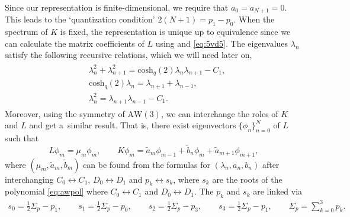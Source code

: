 \documentclass[pdftex]{sigma}
\numberwithin{equation}{section}
\newcommand{\aw}{\mathrm{AW}\!\left(3\right)}
\newcommand{\chq}{\mathrm{cosh}_q}
\newcommand{\half}{\frac{1}{2}}
\begin{document}
Since our representation is finite-dimensional, we require that $a_0=a_{N+1}=0$. This leads to the `quantization condition' $2(N+1)=p_1-p_0$. When the spectrum of $K$ is fixed, the representation is unique up to equivalence since we can calculate the matrix coefficients of $L$ using \cite[equation~(1.12)]{Zhedanov1991} and \eqref{eq:5vd5}. The eigenvalues $\lambda_n$ satisfy the following recursive relations, which we will need later on,
\begin{gather}
\begin{split}
&\lambda_n^2+\lambda_{n+1}^2 = \chq(2)\lambda_n\lambda_{n+1}-C_1, \\
&\chq(2)\lambda_n=\lambda_{n+1}+\lambda_{n-1},\\
&\lambda_n^2=\lambda_{n+1}\lambda_{n-1} -C_1.
\end{split}\label{eq:spectrumrecursiverelations}
\end{gather}
Moreover, using the symmetry of $\aw$, we can interchange the roles of $K$ and $L$ and get a~similar result. That is, there exist eigenvectors $\{\phi_n\}_{n=0}^N$ of $L$ such that
\begin{equation}\label{eq:1vd5omgedraaid}
		L\phi_m=\mu_m \phi_m,\qquad
		K\phi_m=\tilde{a}_m\phi_{m-1}+\tilde{b}_n\phi_m + \tilde{a}_{m+1}\phi_{m+1},
\end{equation}
where $(\mu_m,\tilde{a}_m,\tilde{b}_m)$ can be found from the formulas for $(\lambda_n,a_n,b_n)$ after interchanging $C_0\leftrightarrow C_1$, $D_0\leftrightarrow D_1$ and $p_k\leftrightarrow s_k$, where $s_k$ are the roots of the polynomial \eqref{eq:awpol} where $C_0\leftrightarrow C_1$ and $D_0\leftrightarrow D_1$. The $p_k$ and $s_k$ are linked via
\begin{gather*}
	s_0=\half \Sigma_p - p_1,\qquad\!\! s_1=\half \Sigma_p - p_0,\qquad\!\! s_2=\half \Sigma_p - p_3,\qquad\!\! s_3=\half \Sigma_p - p_1,\qquad\!\! \Sigma_p = \sum_{k=0}^{3}p_k.
\end{gather*}
\end{document}
